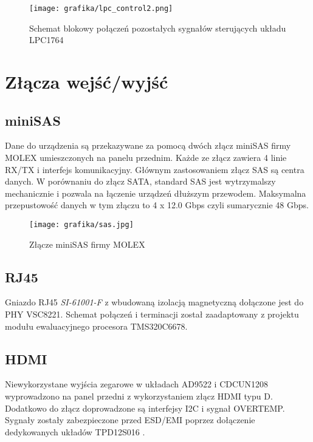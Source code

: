 \begin{figure}[!ht]
\centering
\texttt{[image: grafika/lpc\_control2.png]}
\caption{Schemat blokowy połączeń pozostałych sygnałów sterujących układu LPC1764}
\end{figure}
%

\section{Złącza wejść/wyjść}

\subsection{miniSAS}
Dane do urządzenia są przekazywane za pomocą dwóch złącz miniSAS firmy MOLEX \cite{MINISAS} umieszczonych na panelu przednim. Każde ze złącz zawiera 4 linie RX/TX i interfejs komunikacyjny. Głównym zastosowaniem złącz SAS są centra danych. W porównaniu do złącz SATA, standard SAS jest wytrzymalszy mechanicznie i pozwala na łączenie urządzeń dłuższym przewodem. Maksymalna przepustowość danych w tym złączu to 4 x 12.0 Gbps czyli sumarycznie 48 Gbps.

 \begin{figure}[here]
\begin{center}
\texttt{[image: grafika/sas.jpg]}
\end{center}
\caption{Złącze miniSAS firmy MOLEX}
\label{SAS}
\end{figure}


\subsection{RJ45}
Gniazdo RJ45 \textit{SI-61001-F} z wbudowaną izolacją magnetyczną dołączone jest do PHY VSC8221. Schemat połączeń i terminacji został zaadaptowany z projektu modułu ewaluacyjnego procesora TMS320C6678.  


\subsection{HDMI}
Niewykorzystane wyjścia zegarowe w układach AD9522 i CDCUN1208 wyprowadzono na panel przedni z wykorzystaniem złącz HDMI typu D. Dodatkowo do złącz doprowadzone są interfejsy I2C i sygnał OVERTEMP. Sygnały zostały zabezpieczone przed ESD/EMI poprzez dołączenie dedykowanych układów TPD12S016 \cite{TPD12S016}.

